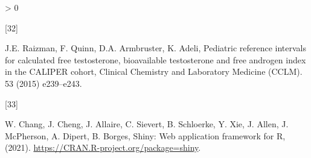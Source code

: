 \documentclass[]{elsarticle} %
\newlength{\csllabelwidth}
\newlength{\cslhangindent}
\newenvironment{CSLReferences}[3] %
 {%
  \setlength{\parindent}{0pt}
  \ifodd #1 \everypar{\setlength{\hangindent}{\cslhangindent}}\ignorespaces\fi
  \ifnum #2 > 0
  \setlength{\parskip}{#2\baselineskip}
  \fi
 }%
 {}
\newcommand{\CSLLeftMargin}[1]{\parbox[t]{\csllabelwidth}{#1}}
\newcommand{\CSLRightInline}[1]{\parbox[t]{\linewidth - \csllabelwidth}{#1}}
\begin{document}
\begin{CSLReferences}{0}{0}
\leavevmode\hypertarget{ref-raizman2015pediatric}{}%
\CSLLeftMargin{{[}32{]} }
\CSLRightInline{J.E. Raizman, F. Quinn, D.A. Armbruster, K. Adeli,
Pediatric reference intervals for calculated free testosterone,
bioavailable testosterone and free androgen index in the CALIPER cohort,
Clinical Chemistry and Laboratory Medicine (CCLM). 53 (2015)
e239--e243.}

\leavevmode\hypertarget{ref-shiny}{}%
\CSLLeftMargin{{[}33{]} }
\CSLRightInline{W. Chang, J. Cheng, J. Allaire, C. Sievert, B.
Schloerke, Y. Xie, J. Allen, J. McPherson, A. Dipert, B. Borges, Shiny:
Web application framework for {R}, (2021).
\url{https://CRAN.R-project.org/package=shiny}.}

\end{CSLReferences}
\end{document}
